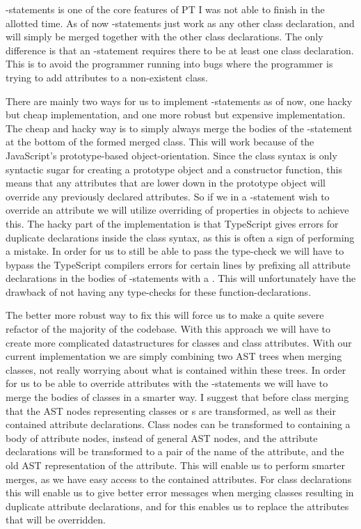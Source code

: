 -statements is one of the core features of PT I was not able to finish in the allotted time.
As of now -statements just work as any other class declaration, and will simply be merged together with the other class declarations.
The only difference is that an -statement requires there to be at least one class declaration.
This is to avoid the programmer running into bugs where the programmer is trying to add attributes to a non-existent class.

There are mainly two ways for us to implement -statements as of now, one hacky but cheap implementation, and one more robust but expensive implementation.
The cheap and hacky way is to simply always merge the bodies of the -statement at the bottom of the formed merged class.
This will work because of the JavaScript's prototype-based object-orientation.
Since the class syntax is only syntactic sugar for creating a prototype object and a constructor function, this means that any attributes that are lower down in the prototype object will override any previously declared attributes.
So if we in a -statement wish to override an attribute we will utilize overriding of properties in objects to achieve this.
The hacky part of the implementation is that TypeScript gives errors for duplicate declarations inside the class syntax, as this is often a sign of performing a mistake.
In order for us to still be able to pass the type-check we will have to bypass the TypeScript compilers errors for certain lines by prefixing all attribute declarations in the bodies of -statements with a .
This will unfortunately have the drawback of not having any type-checks for these function-declarations.

The better more robust way to fix this will force us to make a quite severe refactor of the majority of the codebase.
With this approach we will have to create more complicated datastructures for classes and class attributes.
With our current implementation we are simply combining two AST trees when merging classes, not really worrying about what is contained within these trees.
In order for us to be able to override attributes with the -statements we will have to merge the bodies of classes in a smarter way.
I suggest that before class merging that the AST nodes representing classes or s are transformed, as well as their contained attribute declarations.
Class nodes can be transformed to containing a body of attribute nodes, instead of general AST nodes, and the attribute declarations will be transformed to a pair of the name of the attribute, and the old AST representation of the attribute.
This will enable us to perform smarter merges, as we have easy access to the contained attributes.
For class declarations this will enable us to give better error messages when merging classes resulting in duplicate attribute declarations, and for  this enables us to replace the attributes that will be overridden.

